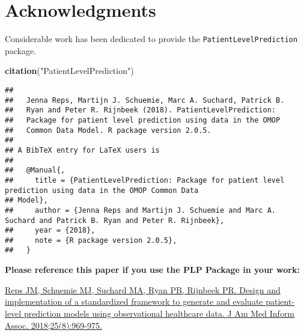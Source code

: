 \documentclass[]{article}
\newenvironment{Shaded}{\begin{snugshade}}{\end{snugshade}}
\newcommand{\KeywordTok}[1]{\textcolor[rgb]{0.13,0.29,0.53}{\textbf{#1}}}
\newcommand{\StringTok}[1]{\textcolor[rgb]{0.31,0.60,0.02}{#1}}
\newcommand{\NormalTok}[1]{#1}
\begin{document}
\section{Acknowledgments}\label{acknowledgments}

Considerable work has been dedicated to provide the
\texttt{PatientLevelPrediction} package.

\begin{Shaded}
\begin{Highlighting}[]
\KeywordTok{citation}\NormalTok{(}\StringTok{"PatientLevelPrediction"}\NormalTok{)}
\end{Highlighting}
\end{Shaded}

\begin{verbatim}
## 
##   Jenna Reps, Martijn J. Schuemie, Marc A. Suchard, Patrick B.
##   Ryan and Peter R. Rijnbeek (2018). PatientLevelPrediction:
##   Package for patient level prediction using data in the OMOP
##   Common Data Model. R package version 2.0.5.
## 
## A BibTeX entry for LaTeX users is
## 
##   @Manual{,
##     title = {PatientLevelPrediction: Package for patient level prediction using data in the OMOP Common Data
## Model},
##     author = {Jenna Reps and Martijn J. Schuemie and Marc A. Suchard and Patrick B. Ryan and Peter R. Rijnbeek},
##     year = {2018},
##     note = {R package version 2.0.5},
##   }
\end{verbatim}

\textbf{Please reference this paper if you use the PLP Package in your
work:}

\href{http://dx.doi.org/10.1093/jamia/ocy032}{Reps JM, Schuemie MJ,
Suchard MA, Ryan PB, Rijnbeek PR. Design and implementation of a
standardized framework to generate and evaluate patient-level prediction
models using observational healthcare data. J Am Med Inform Assoc.
2018;25(8):969-975.}
\end{document}
